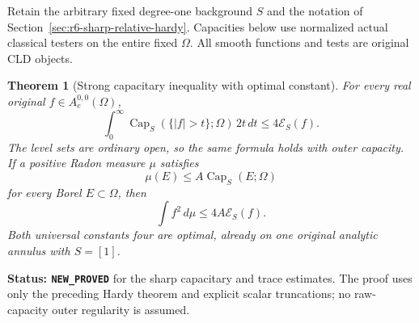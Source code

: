 \documentclass[11pt,a4paper]{article}
\numberwithin{equation}{section}
\newtheorem{theorem}{Theorem}[section]
\theoremstyle{definition}
\theoremstyle{remark}
\begin{document}
Retain the arbitrary fixed degree-one background $S$ and the notation
of Section~\ref{sec:r6-sharp-relative-hardy}. Capacities below use
normalized actual classical testers on the entire fixed $\Omega$.
All smooth functions and tests are original CLD objects.

\begin{theorem}[Strong capacitary inequality with optimal constant]
\label{thm:r6-strong-capacity-four}
For every real original $f\in A_c^{0,0}(\Omega)$,
\begin{equation}
 \int_0^\infty
        \operatorname{Cap}_S(\{|f|>t\};\Omega)\,2t\,dt
                              \le4\mathcal E_S(f).
 \label{eq:r6-strong-capacity-four}
\end{equation}
The level sets are ordinary open, so the same formula holds with outer
capacity. If a positive Radon measure $\mu$ satisfies
\begin{equation}
                  \mu(E)\le A\operatorname{Cap}_S(E;\Omega)
 \label{eq:r6-linear-capacity-domination}
\end{equation}
for every Borel $E\subset\Omega$, then
\begin{equation}
                        \int f^2\,d\mu\le4A\mathcal E_S(f).
 \label{eq:r6-capacity-energy-trace}
\end{equation}
Both universal constants four are optimal, already on one original
analytic annulus with $S=[1]$.
\end{theorem}

\noindent\textbf{Status: \texttt{NEW\_PROVED}} for the sharp capacitary
and trace estimates. The proof uses only the preceding Hardy theorem
and explicit scalar truncations; no raw-capacity outer regularity is
assumed.
\end{document}
